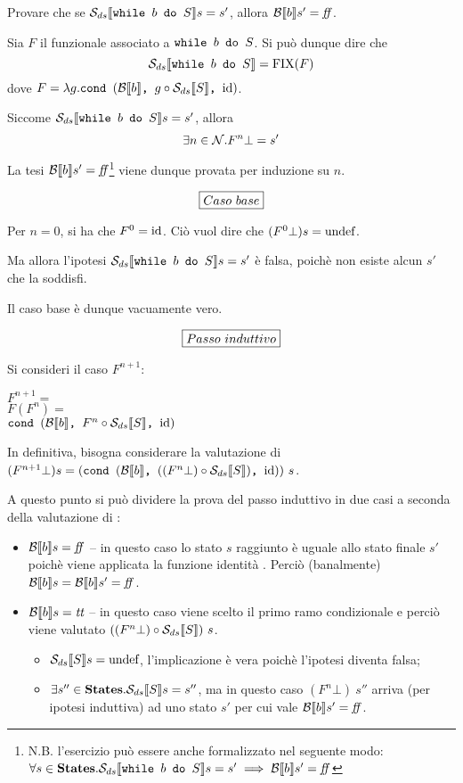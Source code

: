 {
  Provare che se $\dsCtxt{\wbS{b}{S}} s = s'$, allora $\B{b}' = \semfalse$.
}
{
}

Sia $F$ il funzionale associato a $\wbS{b}{S}$. Si può dunque dire che
$$
\dsCtxt{\wbS{b}{S}} = \fixp{F}
$$
dove $F = \lambda{g}.\cond{b}{g \circ \dsCtxt{S}}{\idDS}$.

Siccome $\dsCtxt{\wbS{b}{S}} s = s'$, allora
$$
\exists{n}\in\Ncal. F^n \bot = s'
$$

La tesi $\B{b}' = \semfalse$\footnote{N.B. l'esercizio può essere anche
formalizzato nel seguente modo:
$\forall{s\in\states}.\dsCtxt{\wbS{b}{S}} s = s' \implies \B{b}' = \semfalse$} 
viene dunque provata per induzione su $n$.

$$
\boxer{Caso\ base}
$$

Per $n = 0$, si ha che $F^0 = \idDS$. Ciò vuol dire che
$(F^0 \bot) s = \undefDS$.

Ma allora l'ipotesi $\dsCtxt{\wbS{b}{S}} s = s'$ è falsa,
poichè non esiste alcun $s'$ che la soddisfi.

Il caso base è dunque vacuamente vero.

$$
\boxer{Passo\ induttivo}
$$

Si consideri il caso $F^{n+1}$:
\vspace{.5em}

\noindent $F^{n+1} =$ \\
\noindent $F(F^n) =$ \\
\noindent $\cond{b}{F^n \circ \dsCtxt{S}}{\idDS}$
\vspace{.5em}

In definitiva, bisogna considerare la valutazione di
$(F^{n+1} \bot) s = (\cond{b}{((F^n \bot) \circ \dsCtxt{S})}{\idDS})\ s$.

A questo punto si può dividere la prova del passo induttivo in due casi a
seconda della valutazione di :
\begin{itemize}
  \item $\B{b} = \semfalse$ -- in questo caso lo stato $s$ raggiunto è uguale
    allo stato finale $s'$ poichè viene applicata la funzione identità \idDS{}.
    Perciò (banalmente) $\B{b} = \B{b}' = \semfalse$.
  \item $\B{b} = \semtrue$ -- in questo caso viene scelto il primo ramo
    condizionale e perciò viene valutato
    $((F^n \bot) \circ \dsCtxt{S})\ s$.
    \begin{itemize}
      \item $\dsCtxt{S} s = \undefDS$, l'implicazione è vera poichè l'ipotesi
        diventa falsa;
      \item $\exists{s''}\in\states.\dsCtxt{S} s = s''$, ma in questo caso
        $(F^n \bot)\ s''$ arriva (per ipotesi induttiva) ad uno stato $s'$ per
        cui vale $\B{b}' = \semfalse$.
    \end{itemize}
\end{itemize}
